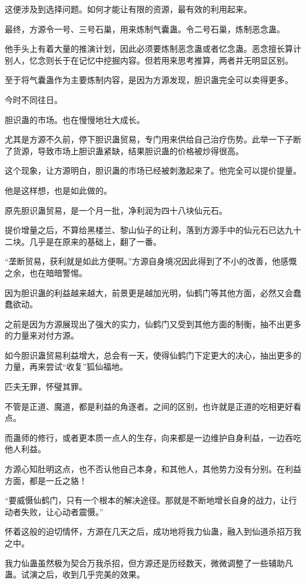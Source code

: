 \begin{this_body}
这便涉及到选择问题。如何才能让有限的资源，最有效的利用起来。

最终，方源令一号、三号石巢，用来炼制气囊蛊。令二号石巢，炼制恶念蛊。

他手头上有着大量的推演计划，因此必须要炼制恶念蛊或者忆念蛊。恶念擅长算计别人，忆念则长于在记忆中挖掘内容。但若用来思考推算，两者并无明显区别。

至于将气囊蛊作为主要炼制内容，是因为方源发现，胆识蛊完全可以卖得更多。

今时不同往日。

胆识蛊的市场。也在慢慢地壮大成长。

尤其是方源不久前，停下胆识蛊贸易，专门用来供给自己治疗伤势。此举一下子断了货源，导致市场上胆识蛊紧缺，结果胆识蛊的价格被炒得很高。

这个现象，让方源明白，胆识蛊的市场已经被刺激起来了。他完全可以提价提量。

他是这样想，也是如此做的。

原先胆识蛊贸易，是一个月一批，净利润为四十八块仙元石。

提价增量之后，不算给黑楼兰、黎山仙子的让利，落到方源手中的仙元石已达九十二块。几乎是在原来的基础上，翻了一番。

“垄断贸易，获利就是如此方便啊。”方源自身境况因此得到了不小的改善，他感慨之余，也在暗暗警惕。

因为胆识蛊的利益越来越大，前景更是越加光明，仙鹤门等其他方面，必然又会蠢蠢欲动。

之前是因为方源展现出了强大的实力，仙鹤门又受到其他方面的制衡，抽不出更多的力量来对付方源。

如今胆识蛊贸易利益增大，总会有一天，使得仙鹤门下定更大的决心，抽出更多的力量，再来尝试“收复”狐仙福地。

匹夫无罪，怀璧其罪。

不管是正道、魔道，都是利益的角逐者。之间的区别，也许就是正道的吃相更好看点。

而蛊师的修行，或者更本质一点人的生存，向来都是一边维护自身利益，一边吞吃他人利益。

方源心知肚明这点，也不否认他自己本身，和其他人，其他势力没有分别。在利益方面，都是一丘之貉！

“要威慑仙鹤门，只有一个根本的解决途径。那就是不断地增长自身的战力，让行动者失败，让心动者震慑。”

怀着这般的迫切情怀，方源在几天之后，成功地将我力仙蛊，融入到仙道杀招万我之中。

我力仙蛊虽然极为契合万我杀招，但方源还是历经数天，微微调整了一些辅助凡蛊。试演之后，收到几乎完美的效果。


\end{this_body}
